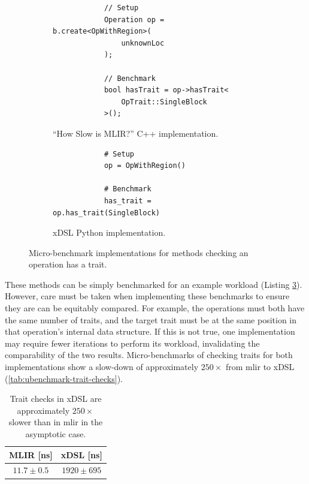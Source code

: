 \begin{figure}[H]
    \centering
    \begin{subfigure}[b]{0.45\textwidth}
       \centering
        \begin{verbatim}
            // Setup
            Operation op = b.create<OpWithRegion>(
                unknownLoc
            );

            // Benchmark
            bool hasTrait = op->hasTrait<
                OpTrait::SingleBlock
            >();
        \end{verbatim}
        \caption{``How Slow is MLIR?'' C++ implementation.}
        \label{listing:ubenchmark-trait-checks-bench-mlir}
    \end{subfigure}
    \hfill
    \begin{subfigure}[b]{0.45\textwidth}
        \centering
        \begin{verbatim}
            # Setup
            op = OpWithRegion()

            # Benchmark
            has_trait = op.has_trait(SingleBlock)
        \end{verbatim}
        \footnotesize\vspace{3em}
        \caption{xDSL Python implementation.}
        \label{listing:ubenchmark-trait-checks-bench-xdsl}
    \end{subfigure}
    \vspace{1em}
    \captionsetup{name=Listing}
    \caption{Micro-benchmark implementations for methods checking an operation has a trait.}
    \label{listing:ubenchmark-trait-checks-bench}
\end{figure}

These methods can be simply benchmarked for an example workload (Listing \ref{listing:ubenchmark-trait-checks-bench}).
However, care must be taken when implementing these benchmarks to ensure they are can be equitably compared. For example, the operations must both have the same number of traits, and the target trait must be at the same position in that operation's internal data structure.
If this is not true, one implementation may require fewer iterations to perform its workload, invalidating the comparability of the two results.
Micro-benchmarks of checking traits for both implementations show a slow-down of approximately $250\times$ from \ac{mlir} to xDSL (\autoref{tab:ubenchmark-trait-checks}).

\begin{table}[H]
  \caption{Trait checks in xDSL are approximately $250\times$ slower than in \ac{mlir} in the asymptotic case.}
  \label{tab:ubenchmark-trait-checks}
  \centering
  \begin{tabular}{cc}
    \toprule
    \textbf{MLIR [ns]} & \textbf{xDSL [ns]}\\
    \midrule
    $11.7 \pm 0.5$ & $1920 \pm 695$ \\
    \bottomrule
  \end{tabular}
\end{table}


